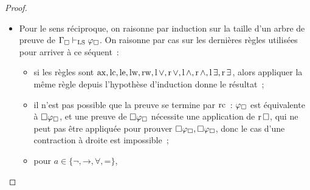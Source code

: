 \begin{proof}
\begin{itemize}
    On procède maintenant à l'induction sur $\vdLJ$ (sans ajouter le cas des
    coupures, grâce au théorème d'élimination des coupures).
    \begin{itemize}
    \item Le résultat est direct dans les cas où la traduction ne modifie pas
      les formules, c'est-à-dire
      $\Rlc,\Rle,\Rlw,\Rrw,\Rlor,\RrorG,\RrorD,\RlandG,\RlandD,
      \Rrand,\Rlex,\Rrex$.
    \item[$\Rlnot$~:] on suppose que $\varCG_{\modSq}\vdLS\varFF_{\modSq}$,
      mais alors $\varCG_{\modSq},\lnot\varFF_{\modSq}\vdLS$ par $\Rlnot$, puis
      $\varCG_{\modSq},\modSq\lnot\varFF_{\modSq}\vdLS$ par $\Rlsq$.
    \item[$\Rrnot$~:] on suppose que $\varCG_{\modSq},\varFF_{\modSq}\vdLS$,
      donc $\varCG_{\modSq}\vdLS\lnot\varFF_{\modSq}$ par $\Rrnot$, et puisque
      $\varCG_{\modSq}$ est équivalent à $\modSq\varCG_{\modSq}$, on peut
      appliquer $\Rrsq^\ddagger$ pour avoir
      $\varCG_{\modSq}\vdLS\modSq\lnot\varFF_{\modSq}$.
    \item Dans tous les autres cas, il suffit de procéder de façon analogue~:
      pour la règle gauche, on applique la même règle puis $\Rlsq$ et pour
      la règle droite, on applique la même règle puis $\Rrsq^\ddagger$, dont
      la condition est vérifiée grâce au fait que $\varCG_{\modSq}$ est
      équivalent à $\modSq\varCG_{\modSq}$.
    \end{itemize}
  \item Pour le sens réciproque, on raisonne par induction sur la taille d'un
    arbre de preuve de $\varCG_{\modSq}\vdLS\varFF_{\modSq}$. On raisonne par cas
    sur les dernières règles utilisées pour arriver à ce séquent~:
    \begin{itemize}
    \item si les règles sont $\operatorname{ax},\operatorname{lc},\operatorname{le},\operatorname{lw},\operatorname{rw},\operatorname{l}\mathord{\lor},\operatorname{r}\mathord{\lor},\operatorname{l}\mathord{\land},
      \operatorname{r}\mathord{\land},\operatorname{l}\mathord{\exists},\operatorname{r}\mathord{\exists}$, alors appliquer la même règle depuis l'hypothèse
      d'induction donne le résultat~;
    \item il n'est pas possible que la preuve se termine par $\operatorname{rc}$~:
      $\varphi_{\mathbin{\square}}$ est équivalente à $\mathbin{\square}\varphi_{\mathbin{\square}}$, et une preuve
      de $\mathbin{\square}\varphi_{\mathbin{\square}}$ nécessite une application de $\operatorname{r}\mathord{\mathbin{\square}}$, qui
      ne peut pas être appliquée pour prouver
      $\mathbin{\square}\varphi_{\mathbin{\square}},\mathbin{\square}\varphi_{\mathbin{\square}}$, donc le cas d'une
      contraction à droite est impossible~;
    \item pour
      $a \in \{\mathord{\lnot},\mathord{\to},\mathord{\forall},\mathord{=}\}$,

\end{itemize}
\end{itemize}
\end{proof}

